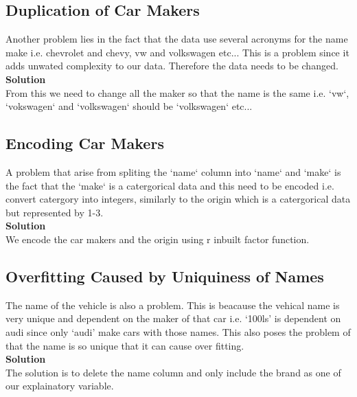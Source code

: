 \documentclass[11pt]{article} %
\begin{document}
\subsection{Duplication of Car Makers}
Another problem lies in the fact that the data use several acronyms for the name make i.e. chevrolet and chevy, vw and volkswagen etc... This is a problem since it adds unwated complexity to our data. Therefore the data needs to be changed.\\
\textbf{Solution}\\
From this we need to change all the maker so that the name is the same i.e. `vw`, `vokswagen` and `volkswagen` should be `volkswagen` etc...

\subsection{Encoding Car Makers}
A problem that arise from spliting the `name` column into `name` and `make` is the fact that the `make` is a catergorical data and this need to be encoded i.e. convert catergory into integers, similarly to the origin which is a catergorical data but represented by 1-3.\\
\textbf{Solution}\\
We encode the car makers and the origin using r inbuilt factor function.
\subsection{Overfitting Caused by Uniquiness of Names}
The name of the vehicle is also a problem. This is beacause the vehical name is very unique and dependent on the maker of that car i.e. `100ls' is dependent on audi since only `audi' make cars with those names. This also poses the problem of that the name is so unique that it can cause over fitting.\\ 
\textbf{Solution}\\
The solution is to delete the name column and only include the brand as one of our explainatory variable.
\end{document}

